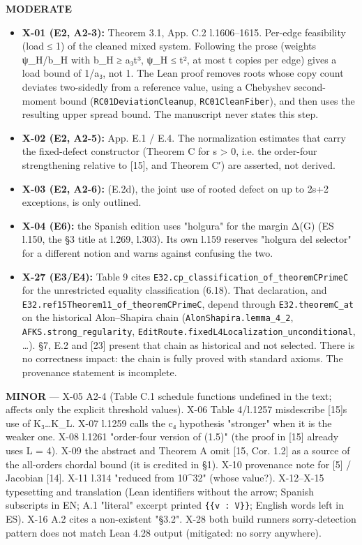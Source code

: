 \documentclass[
]{article}
\providecommand{\tightlist}{%
  \setlength{\itemsep}{0pt}\setlength{\parskip}{0pt}}
\begin{document}
\textbf{MODERATE}

\begin{itemize}
\tightlist
\item
  \textbf{X-01 (E2, A2-3):} Theorem 3.1, App. C.2 l.1606--1615. Per-edge
  feasibility (load ≤ 1) of the cleaned mixed system. Following the
  prose (weights ψ\_H/b\_H with b\_H ≥ a₃t³, ψ\_H ≤ t², at most t copies
  per edge) gives a load bound of 1/a₃, not 1. The Lean proof removes
  roots whose copy count deviates two-sidedly from a reference value,
  using a Chebyshev second-moment bound (\texttt{RC01DeviationCleanup},
  \texttt{RC01CleanFiber}), and then uses the resulting upper spread
  bound. The manuscript never states this step.
\item
  \textbf{X-02 (E2, A2-5):} App. E.1 / E.4. The normalization estimates
  that carry the fixed-defect constructor (Theorem C for s
  \textgreater{} 0, i.e. the order-four strengthening relative to
  {[}15{]}, and Theorem C′) are asserted, not derived.
\item
  \textbf{X-03 (E2, A2-6):} (E.2d), the joint use of rooted defect on up
  to 2s+2 exceptions, is only outlined.
\item
  \textbf{X-04 (E6):} the Spanish edition uses "holgura" for the margin
  Δ(G) (ES l.150, the §3 title at l.269, l.303). Its own l.159 reserves
  "holgura del selector" for a different notion and warns against
  confusing the two.
\item
  \textbf{X-27 (E3/E4):} Table 9 cites
  \texttt{E32.cp\_classification\_of\_theoremCPrimeC} for the
  unrestricted equality classification (6.18). That declaration, and
  \texttt{E32.ref15Theorem11\_of\_theoremCPrimeC}, depend through
  \texttt{E32.theoremC\_at} on the historical Alon--Shapira chain
  (\texttt{AlonShapira.lemma\_4\_2}, \texttt{AFKS.strong\_regularity},
  \texttt{EditRoute.fixedL4Localization\_unconditional}, \ldots). §7,
  E.2 and {[}23{]} present that chain as historical and not selected.
  There is no correctness impact: the chain is fully proved with
  standard axioms. The provenance statement is incomplete.
\end{itemize}

\textbf{MINOR} --- X-05 A2-4 (Table C.1 schedule functions undefined in
the text; affects only the explicit threshold values). X-06 Table
4/l.1257 misdescribe {[}15{]}\textquotesingle s use of K₃\ldots K\_L.
X-07 l.1259 calls the c₄ hypothesis "stronger" when it is the weaker
one. X-08 l.1261 "order-four version of (1.5)" (the proof in {[}15{]}
already uses L = 4). X-09 the abstract and Theorem A omit {[}15, Cor.
1.2{]} as a source of the all-orders chordal bound (it is credited in
§1). X-10 provenance note for {[}5{]} / Jacobian {[}14{]}. X-11 l.314
"reduced from 10\^{}32" (whose value?). X-12--X-15 typesetting and
translation (Lean identifiers without the arrow; Spanish subscripts in
EN; A.1 "literal" excerpt printed \texttt{\{\{v\ :\ V\}\}}; English
words left in ES). X-16 A.2 cites a non-existent "§3.2". X-28 both build
runners\textquotesingle{} sorry-detection pattern does not match Lean
4.28 output (mitigated: no sorry anywhere).
\end{document}
